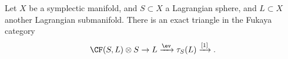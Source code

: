 
    Let $X$ be a symplectic manifold, and $S\subset X$ a Lagrangian sphere, and $L\subset X$ another Lagrangian submanifold. There is an exact triangle in the Fukaya category
    \[ \CF(S, L)\otimes S \to L \xrightarrow{\ev} \tau_S(L)\xrightarrow{[1]}.\]

